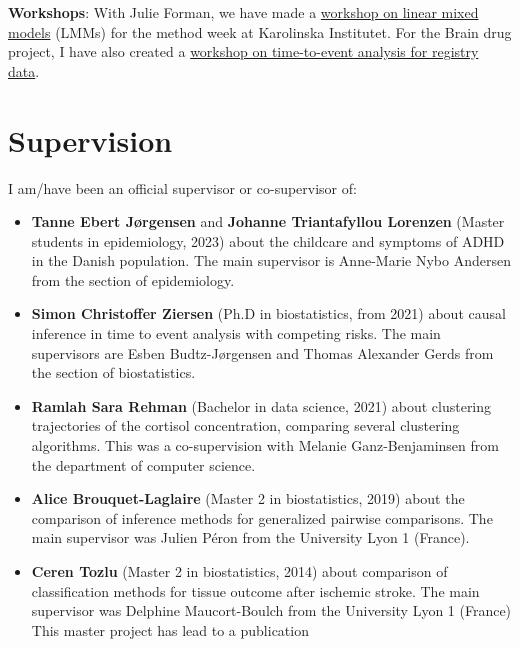 \documentclass[12pt]{article}
\begin{document}
\medskip

\noindent \textbf{Workshops}: With Julie Forman, we have made a \href{https://github.com/bozenne/bozenne.github.io/tree/master/doc/Teaching/2022-Workshop-LMMstar}{workshop on
linear mixed models} (LMMs) for the method week at Karolinska
Institutet. For the Brain drug project, I have also created a \href{https://github.com/bozenne/bozenne.github.io/tree/master/doc/Teaching/2023-Workshop-Epi}{workshop
on time-to-event analysis for registry data}.


\section{Supervision}
\label{sec:org457d72c}

I am/have been an official supervisor or co-supervisor of:
\begin{itemize}
\item \textbf{Tanne Ebert Jørgensen} and \textbf{Johanne Triantafyllou Lorenzen} (Master
students in epidemiology, 2023) about the childcare and symptoms of
ADHD in the Danish population. The main supervisor is Anne-Marie
Nybo Andersen from the section of epidemiology.
\item \textbf{Simon Christoffer Ziersen} (Ph.D in biostatistics, from 2021) about
causal inference in time to event analysis with competing risks. The
main supervisors are Esben Budtz-Jørgensen and Thomas Alexander
Gerds from the section of biostatistics.
\item \textbf{Ramlah Sara Rehman} (Bachelor in data science, 2021) about clustering
trajectories of the cortisol concentration, comparing several
clustering algorithms. This was a co-supervision with Melanie
Ganz-Benjaminsen from the department of computer science.
\item \textbf{Alice Brouquet-Laglaire} (Master 2 in biostatistics, 2019) about the
comparison of inference methods for generalized pairwise
comparisons. The main supervisor was Julien Péron from the
University Lyon 1 (France).
\item \textbf{Ceren Tozlu} (Master 2 in biostatistics, 2014) about comparison of
classification methods for tissue outcome after ischemic stroke. The
main supervisor was Delphine Maucort-Boulch from the University Lyon
1 (France) This master project has lead to a publication
\citep{tozlu2019comparison}
\end{itemize}

\bigskip
\end{document}
